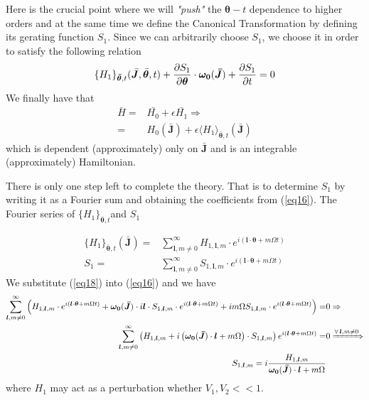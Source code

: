 	Here is the crucial point where we will \textit{"push"} the $\bm{\theta}-t$ dependence to higher orders and at the same time we define the Canonical Transformation by defining its gerating function $S_1$. Since we can arbitrarily choose $S_1$, we choose it in order to satisfy the following relation
	\begin{equation}\label{eq16}
		\{H_1\}_{\bm{\bar{\theta}}, t}(\bar{\bm{J}}, \bar{\bm{\theta}}, t) + \pdv{S_1}{\bm{\theta}}\cdot \bm{\omega_0}(\bm{\bar{J}})+ \pdv{S_1}{t} = 0
	\end{equation}	
We finally have that 
	\begin{align}\label{eq17}
		\bar{H} =&  \bar{H_0} + \epsilon\bar{H_1}  \Rightarrow\nonumber\\
				=& H_0(\bar{\bm{J}}) + \epsilon\langle H_1 \rangle_{\bm{\bar{\theta}}, t}(\bar{\bm{J}}) 
	\end{align}
which is dependent (approximately) only on $\bar{\bm{J}}$ and is an integrable (approximately) Hamiltonian.

There is only one step left to complete the theory. That is to determine $S_1$ by writing it as a Fourier sum and obtaining the coefficients from (\ref{eq16}). The Fourier series of $\{H_1\}_{\bm{\bar{\theta}},t}$\footnotemark and $S_1$
	
\begin{subequations}\label{eq18}
		\begin{alignat}{2}	
		\{H_1\}_{\bm{\bar{\theta}},t}(\bm{\bar{J}}) =& \sum_{\bm{l},m\neq0}^\infty H_{1,\bm{l},m} \cdot e^{i(\bm{l}\cdot\bm{\theta}+m\Omega t)} \\ 
		S_1                           =& \sum_{\bm{l},m\neq0}^\infty S_{1,\bm{l},m} \cdot e^{i(\bm{l}\cdot\bm{\theta}+m\Omega t)} 
		\end{alignat}
\end{subequations}	
%
We substitute (\ref{eq18}) into (\ref{eq16}) and we have 
	\begin{align}\label{eq19} 
			\sum_{\bm{l},m\neq0}^\infty \left( H_{1,\bm{l},m} \cdot 
			e^{i(\bm{l}\cdot\bm{\theta}+m\Omega t)} + \bm{\omega_0}(\bm{\bar{J}})\cdot i\bm{l} \cdot S_{1,\bm{l},m} \cdot e^{i(\bm{l}\cdot\bm{\theta}+m\Omega t)} +
			im\Omega S_{1,\bm{l},m} \cdot e^{i(\bm{l}\cdot\bm{\theta}+m\Omega t)}\right) =& 0 \Rightarrow \nonumber \\ 
			\sum_{\bm{l},m\neq0}^\infty \left(  H_{1,\bm{l},m} + i\left(\bm{\omega_0}(\bm{\bar{J}})\cdot \bm{l}  + m\Omega\right)\cdot S_{1,\bm{l},m}  
					\right)e^{i(\bm{l}\cdot\bm{\theta}+m\Omega t)} =& 0  \xRightarrow{\forall\hspace{0.05cm}\bm{l},m\neq0} \nonumber \\
			\hspace{-2cm}S_{1,\bm{l},m} =  i\frac{H_{1,\bm{l},m}}{\bm{\omega_0}(\bm{\bar{J}})\cdot \bm{l} + m\Omega}&
	\end{align}
%
where $H_1$ may act as a perturbation whether $V_1,V_2<<1$.

